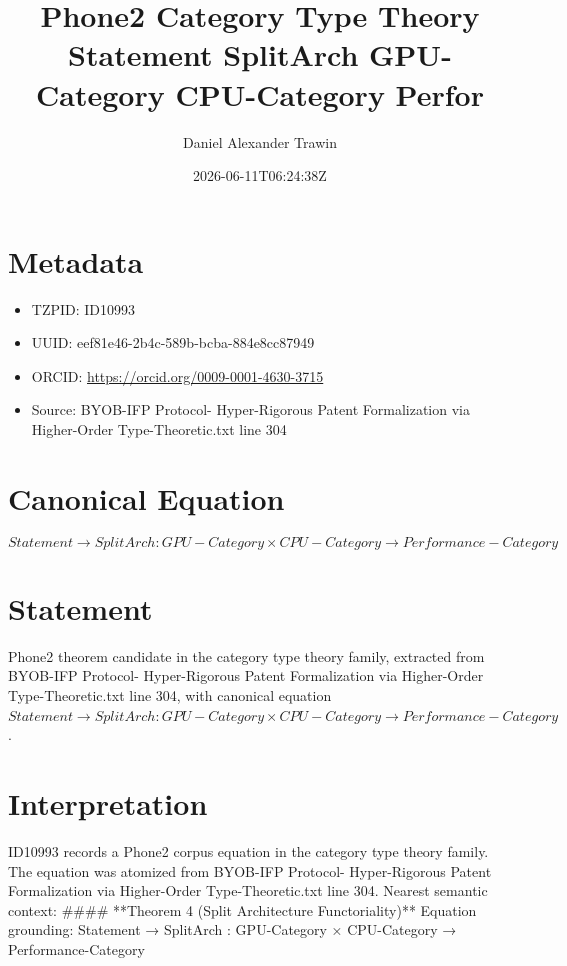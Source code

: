 \documentclass[11pt]{article}
\title{Phone2 Category Type Theory Statement SplitArch GPU-Category CPU-Category Perfor}
\author{Daniel Alexander Trawin}
\date{2026-06-11T06:24:38Z}
\begin{document}
\maketitle
\section*{Metadata}
\begin{itemize}
\item TZPID: ID10993
\item UUID: eef81e46-2b4c-589b-bcba-884e8cc87949
\item ORCID: \url{https://orcid.org/0009-0001-4630-3715}
\item Source: BYOB-IFP Protocol- Hyper-Rigorous Patent Formalization via Higher-Order Type-Theoretic.txt line 304
\end{itemize}
\section*{Canonical Equation}
\[
Statement → SplitArch : GPU-Category × CPU-Category → Performance-Category
\]
\section*{Statement}
Phone2 theorem candidate in the category type theory family, extracted from BYOB-IFP Protocol- Hyper-Rigorous Patent Formalization via Higher-Order Type-Theoretic.txt line 304, with canonical equation $Statement → SplitArch : GPU-Category × CPU-Category → Performance-Category$.
\section*{Interpretation}
ID10993 records a Phone2 corpus equation in the category type theory family. The equation was atomized from BYOB-IFP Protocol- Hyper-Rigorous Patent Formalization via Higher-Order Type-Theoretic.txt line 304. Nearest semantic context: #### **Theorem 4 (Split Architecture Functoriality)** Equation grounding: Statement → SplitArch : GPU-Category × CPU-Category → Performance-Category
\end{document}
